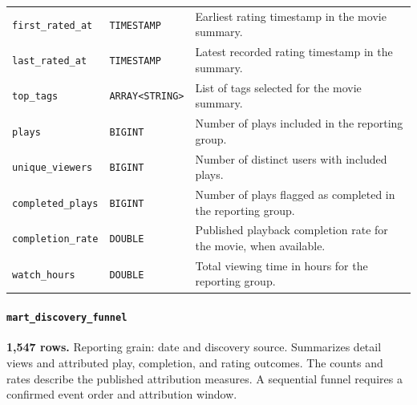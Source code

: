\documentclass[a4paper,12pt]{article}
\newcommand{\dbsep}{\_\allowbreak}
\begin{document}
\begin{longtable}{@{}>{\raggedright\arraybackslash}p{}
                    >{\raggedright\arraybackslash}p{}
                    >{\raggedright\arraybackslash}p{}@{}}
\texttt{first\dbsep rated\dbsep at} & \texttt{TIMESTAMP} & Earliest rating timestamp in the movie summary.\\
\texttt{last\dbsep rated\dbsep at} & \texttt{TIMESTAMP} & Latest recorded rating timestamp in the summary.\\
\texttt{top\dbsep tags} & \texttt{ARRAY\allowbreak\textless{}STRING\textgreater{}} & List of tags selected for the movie summary.\\
\texttt{plays} & \texttt{BIGINT} & Number of plays included in the reporting group.\\
\texttt{unique\dbsep viewers} & \texttt{BIGINT} & Number of distinct users with included plays.\\
\texttt{completed\dbsep plays} & \texttt{BIGINT} & Number of plays flagged as completed in the reporting group.\\
\texttt{completion\dbsep rate} & \texttt{DOUBLE} & Published playback completion rate for the movie, when available.\\
\texttt{watch\dbsep hours} & \texttt{DOUBLE} & Total viewing time in hours for the reporting group.\\
\end{longtable}
\endgroup

\paragraph{\texttt{mart\dbsep discovery\dbsep funnel}}
\textbf{1,547 rows.} Reporting grain: date and discovery source.
Summarizes detail views and attributed play, completion, and rating outcomes. The counts and rates describe the published attribution measures. A sequential funnel requires a confirmed event order and attribution window.
\end{document}
